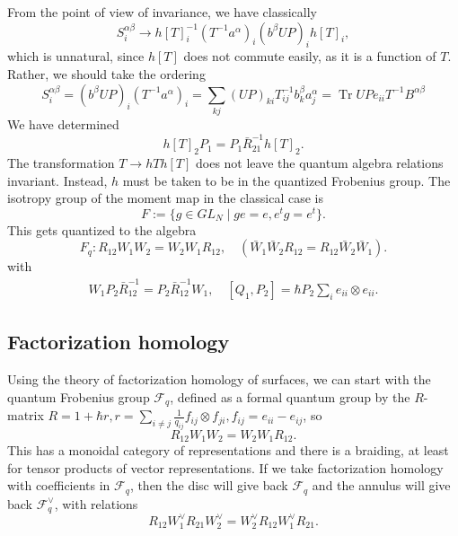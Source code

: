 \documentclass[11pt]{report}
\theoremstyle{definition}
\theoremstyle{remark}
\theoremstyle{remark}
\begin{document}
From the point of view of invariance, we have classically
\begin{equation*}
S_i^{\alpha\beta} \to h[T]_i^{-1} (T^{-1} a^\alpha)_i (b^\beta UP)_i h[T]_i,
\end{equation*}
which is unnatural, since $h[T]$ does not commute easily, as it is a function of $T$. Rather, we should take the ordering
\begin{equation*}
S_i^{\alpha\beta} = (b^\beta UP)_i (T^{-1} a^\alpha)_i = \sum_{kj} (UP)_{ki} T_{ij}^{-1} b_k^\beta a_j^\alpha = \operatorname{Tr} UP e_{ii} T^{-1} B^{\alpha\beta}
\end{equation*}
We have determined
\begin{equation*}
h[T]_2 P_1 = P_1 \bar R_{21}^{-1} h[T]_2.
\end{equation*}
The transformation $T \to h T h[T]$ does not leave the quantum algebra relations invariant. Instead, $h$ must be taken to be in the quantized Frobenius group. The isotropy group of the moment map in the classical case is
\begin{equation*}
F := \{ g \in GL_N \mid ge = e, e^t g = e^t \}.
\end{equation*}
This gets quantized to the algebra
\begin{equation*}
F_q: R_{12} W_1 W_2 = W_2 W_1 R_{12}, \quad (\bar W_1 \bar W_2 R_{12} = R_{12} \bar W_2 \bar W_1).
\end{equation*}
with
\begin{align*}
W_1 P_2 \bar R_{12}^{-1} = P_2 \bar R_{12}^{-1} W_1, \quad [Q_1,P_2] = \hbar P_2 \sum_i e_{ii} \otimes e_{ii}.
\end{align*}

\subsection{Factorization homology}

Using the theory of factorization homology of surfaces, we can start with the quantum Frobenius group $\mathcal{F}_q$, defined as a formal quantum group by the $R$-matrix $R = 1 + \hbar r, r = \sum_{i \neq j} \frac{1}{q_{ij}} f_{ij} \otimes f_{ji}, f_{ij} = e_{ii}-e_{ij}$, so
\begin{equation*}
R_{12} W_1 W_2 = W_2 W_1 R_{12}.
\end{equation*}
This has a monoidal category of representations and there is a braiding, at least for tensor products of vector representations. If we take factorization homology with coefficients in $\mathcal{F}_q$, then the disc will give back $\mathcal{F}_q$ and the annulus will give back $\mathcal{F}_q^\vee$, with relations
\begin{equation*}
R_{12} W_1^\vee R_{21} W_2^\vee = W_2^\vee R_{12} W_1^\vee R_{21}.
\end{equation*}
\end{document}
